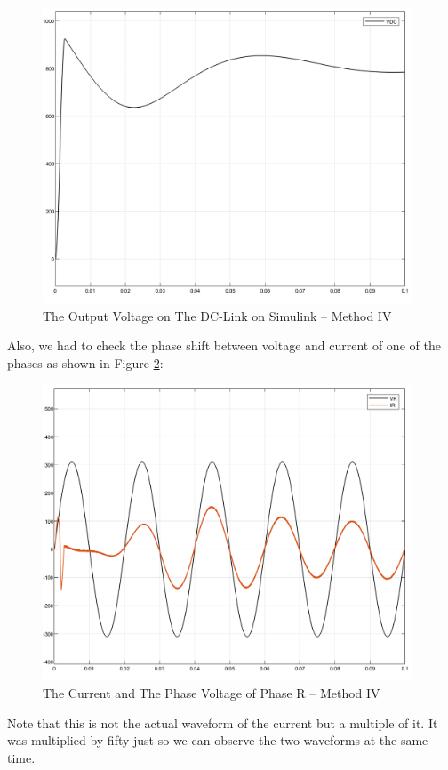 \documentclass[12pt,a4paper]{book}
\begin{document}
\begin{figure}[h!]
  \centering
  \includegraphics[width=11cm]{image26.png}
  \caption{The Output Voltage on The DC-Link on Simulink -- Method IV}
  \label{fig:image26}
\end{figure}
Also, we had to check the phase shift between voltage and current of one of the phases as shown in Figure \ref{fig:image27}:

\begin{figure}[h!]
  \centering
  \includegraphics[width=11cm]{image27.png}
  \caption{The Current and The Phase Voltage of Phase R -- Method IV}
  \label{fig:image27}
\end{figure}
Note that this is not the actual waveform of the current but a multiple of it. It was multiplied by fifty just so we can observe the two waveforms at the same time.
\end{document}
